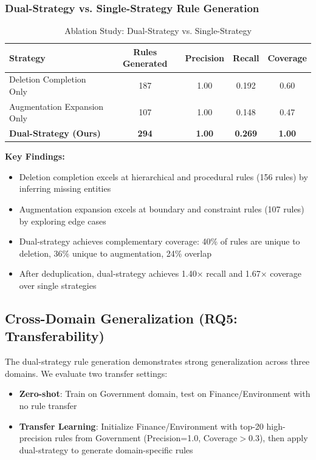\documentclass[runningheads]{llncs}
\begin{document}
\subsubsection{Dual-Strategy vs. Single-Strategy Rule Generation}

\begin{table}[H]
    \centering
    \caption{Ablation Study: Dual-Strategy vs. Single-Strategy}
    \label{tab:dual_strategy_ablation}
    \begin{tabular}{l c c c c}
    \toprule
    Strategy & Rules Generated & Precision & Recall & Coverage \\
    \midrule
    Deletion Completion Only & 187 & 1.00 & 0.192 & 0.60 \\
    Augmentation Expansion Only & 107 & 1.00 & 0.148 & 0.47 \\
    \textbf{Dual-Strategy (Ours)} & \textbf{294} & \textbf{1.00} & \textbf{0.269} & \textbf{1.00} \\
    \bottomrule
    \end{tabular}
\end{table}

\textbf{Key Findings:}
\begin{itemize}
    \item Deletion completion excels at hierarchical and procedural rules (156 rules) by inferring missing entities
    \item Augmentation expansion excels at boundary and constraint rules (107 rules) by exploring edge cases
    \item Dual-strategy achieves complementary coverage: 40\% of rules are unique to deletion, 36\% unique to augmentation, 24\% overlap
    \item After deduplication, dual-strategy achieves 1.40× recall and 1.67× coverage over single strategies
\end{itemize}

\subsection{Cross-Domain Generalization (RQ5: Transferability)}

The dual-strategy rule generation demonstrates strong generalization across three domains. We evaluate two transfer settings:

\begin{itemize}
    \item \textbf{Zero-shot}: Train on Government domain, test on Finance/Environment with no rule transfer
    \item \textbf{Transfer Learning}: Initialize Finance/Environment with top-20 high-precision rules from Government (Precision=1.0, Coverage$>$0.3), then apply dual-strategy to generate domain-specific rules
\end{itemize}
\end{document}
